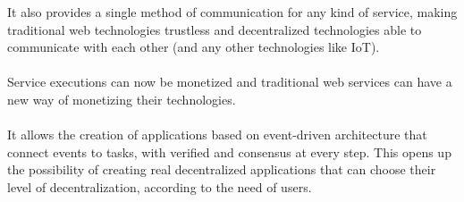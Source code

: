 \documentclass[12pt,a4paper,final]{article}
\begin{document}
It also provides a single method of communication for any kind of service, making traditional web technologies trustless and decentralized technologies able to communicate with each other (and any other technologies like IoT).
\\\\
Service executions can now be monetized and traditional web services can have a new way of monetizing their technologies. 
\\\\
It allows the creation of applications based on event-driven architecture that connect events to tasks, with verified and consensus at every step. This opens up the possibility of creating real decentralized applications that can choose their level of decentralization, according to the need of users.
\end{document}
